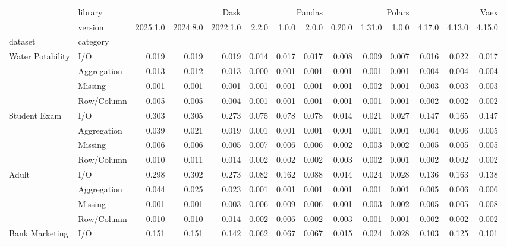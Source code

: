 \begin{tabular}{llrrrrrrrrrrrr}
\toprule
 & library & \multicolumn{3}{r}{Dask} & \multicolumn{3}{r}{Pandas} & \multicolumn{3}{r}{Polars} & \multicolumn{3}{r}{Vaex} \\
 & version & 2025.1.0 & 2024.8.0 & 2022.1.0 & 2.2.0 & 1.0.0 & 2.0.0 & 0.20.0 & 1.31.0 & 1.0.0 & 4.17.0 & 4.13.0 & 4.15.0 \\
dataset & category &  &  &  &  &  &  &  &  &  &  &  &  \\
\midrule
\multirow[t]{4}{*}{Water Potability} & I/O & 0.019 & 0.019 & 0.019 & 0.014 & 0.017 & 0.017 & 0.008 & 0.009 & 0.007 & 0.016 & 0.022 & 0.017 \\
 & Aggregation & 0.013 & 0.012 & 0.013 & 0.000 & 0.001 & 0.001 & 0.001 & 0.001 & 0.001 & 0.004 & 0.004 & 0.004 \\
 & Missing & 0.001 & 0.001 & 0.001 & 0.001 & 0.001 & 0.001 & 0.001 & 0.002 & 0.001 & 0.003 & 0.003 & 0.003 \\
 & Row/Column & 0.005 & 0.005 & 0.004 & 0.001 & 0.001 & 0.001 & 0.001 & 0.001 & 0.001 & 0.002 & 0.002 & 0.002 \\
\cline{1-14}
\multirow[t]{4}{*}{Student Exam} & I/O & 0.303 & 0.305 & 0.273 & 0.075 & 0.078 & 0.078 & 0.014 & 0.021 & 0.027 & 0.147 & 0.165 & 0.147 \\
 & Aggregation & 0.039 & 0.021 & 0.019 & 0.001 & 0.001 & 0.001 & 0.001 & 0.001 & 0.001 & 0.004 & 0.006 & 0.005 \\
 & Missing & 0.006 & 0.006 & 0.005 & 0.007 & 0.006 & 0.006 & 0.002 & 0.003 & 0.002 & 0.005 & 0.005 & 0.005 \\
 & Row/Column & 0.010 & 0.011 & 0.014 & 0.002 & 0.002 & 0.002 & 0.003 & 0.002 & 0.001 & 0.002 & 0.002 & 0.002 \\
\cline{1-14}
\multirow[t]{4}{*}{Adult} & I/O & 0.298 & 0.302 & 0.273 & 0.082 & 0.162 & 0.088 & 0.014 & 0.024 & 0.028 & 0.136 & 0.163 & 0.138 \\
 & Aggregation & 0.044 & 0.025 & 0.023 & 0.001 & 0.001 & 0.001 & 0.001 & 0.001 & 0.001 & 0.005 & 0.006 & 0.006 \\
 & Missing & 0.001 & 0.001 & 0.003 & 0.006 & 0.009 & 0.006 & 0.001 & 0.003 & 0.002 & 0.005 & 0.005 & 0.008 \\
 & Row/Column & 0.010 & 0.010 & 0.014 & 0.002 & 0.006 & 0.002 & 0.003 & 0.001 & 0.001 & 0.002 & 0.002 & 0.002 \\
\cline{1-14}
\multirow[t]{4}{*}{Bank Marketing} & I/O & 0.151 & 0.151 & 0.142 & 0.062 & 0.067 & 0.067 & 0.015 & 0.024 & 0.028 & 0.103 & 0.125 & 0.101 \\

\end{tabular}
